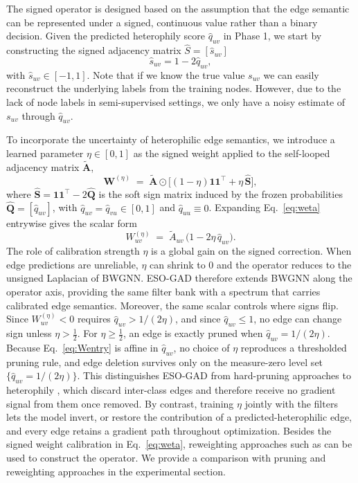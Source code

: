 The signed operator is designed based on the assumption that the edge semantic can be represented under a signed, continuous value rather than a binary decision.
Given the predicted heterophily score $\hat{q}_{uv}$ in Phase 1, we start by constructing the signed adjacency matrix $\hat{S} = [\hat{s}_{uv}]$ 
\begin{equation}
    \hat{s}_{uv} = 1 - 2 \hat{q}_{uv},
    \label{eq:suv}
\end{equation}
with $\hat{s}_{uv} \in [-1,1]$.
Note that if we know the true value $s_{uv}$ we can easily reconstruct the underlying labels from the training nodes.
However, due to the lack of node labels in semi-supervised settings, we only have a noisy estimate of $s_{uv}$ through $\hat{q}_{uv}$.

To incorporate the uncertainty of heterophilic edge semantics, we introduce a
learned parameter $\eta\in[0,1]$ as the signed weight applied to the self-looped
adjacency matrix $\tilde{\bm A}$,
\begin{equation}
    \bm{W}^{(\eta)} \;=\; \tilde{\bm{A}}\odot\bigl[(1-\eta)\bm{1}\bm{1}^{\!\top}
    + \eta\,\hat{\bm{S}}\bigr],
    \label{eq:weta}
\end{equation}
where $\hat{\bm S}=\bm{1}\bm{1}^{\!\top}-2\hat{\bm Q}$ is the soft sign matrix
induced by the frozen probabilities $\hat{\bm Q}=[\hat q_{uv}]$,
with $\hat q_{uv}=\hat q_{vu}\in[0,1]$ and $\hat q_{uu}\equiv 0$.
Expanding Eq.~\eqref{eq:weta} entrywise gives the scalar form
\begin{equation}
W^{(\eta)}_{uv} \;=\; \tilde A_{uv}\,\bigl(1-2\eta\,\hat q_{uv}\bigr).
\label{eq:Wentry}
\end{equation}
The role of calibration strength $\eta$ is a global gain on the signed correction.
When edge predictions are unreliable, $\eta$ can shrink to $0$ and the operator reduces to the unsigned Laplacian of BWGNN.
ESO-GAD therefore extends BWGNN along the operator axis, providing the same filter bank with a spectrum that carries calibrated edge semantics.
Moreover, the same scalar controls where signs flip.
Since $W^{(\eta)}_{uv}<0$ requires $\hat q_{uv}>1/(2\eta)$, and
since $\hat q_{uv}\le 1$, no edge can change sign unless $\eta>\tfrac12$.
For $\eta\ge\tfrac12$, an edge is exactly pruned when $\hat q_{uv}=1/(2\eta)$.
Because Eq.~\eqref{eq:Wentry} is affine in
$\hat q_{uv}$, no choice of $\eta$ reproduces a thresholded pruning rule, and edge deletion survives only on the measure-zero level set $\{\hat q_{uv}=1/(2\eta)\}$.
This distinguishes ESO-GAD from hard-pruning approaches to heterophily \citep{GHRN, CARE-GNN}, which discard inter-class edges and therefore
receive no gradient signal from them once removed.
By contrast, training $\eta$ jointly with the filters lets the model invert, or restore the contribution of a predicted-heterophilic edge, and every edge retains a gradient path throughout optimization.
Besides the signed weight calibration in Eq.~\eqref{eq:weta}, reweighting approaches such as \citep{SEC-GFD} can be used to construct the operator.
We provide a comparison with pruning and reweighting approaches in the experimental section.

